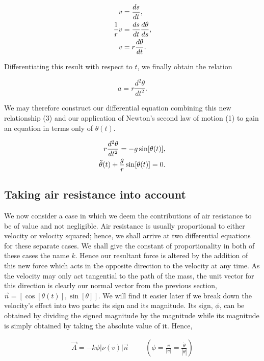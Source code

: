 \documentclass{article}
\begin{document}
\begin{align}
	v &= \frac{ds}{dt}, \notag \\
	\frac{1}{r} v &= \frac{ds}{dt} \frac{d\theta}{ds}, \notag \\
	v &= r \frac{d\theta}{dt}.
\end{align}

Differentiating this result with respect to $t$, we finally obtain the relation

\begin{equation}
	a = r \frac{d^2\theta}{dt^2}.
\end{equation}

We may therefore construct our differential equation combining this new relationship (3) and our application of Newton's second law of motion (1) to gain an equation in terms only of $\theta(t)$.

\begin{align}
	r \frac{d^2\theta}{dt^2} = -g\sin[\theta(t)], \notag \\
	\ddot{\theta}(t) + \frac{g}{r}\sin[\theta(t)] = 0.
\end{align}

\subsection{Taking air resistance into account}

We now consider a case in which we deem the contributions of air resistance to be of value and not negligible. Air resistance is usually proportional to either velocity or velocity squared; hence, we shall arrive at two differential equations for these separate cases. We shall give the constant of proportionality in both of these cases the name $k$. Hence our resultant force is altered by the addition of this new force which acts in the opposite direction to the velocity at any time. As the velocity may only act tangential to the path of the mass, the unit vector for this direction is clearly our normal vector from the previous section, $\vec{n} = [\cos[\theta(t)], \sin[\theta]]$. We will find it easier later if we break down the velocity's effect into two parts: its sign and its magnitude. Its sign, $\phi$, can be obtained by dividing the signed magnitude by the magnitude while its magnitude is simply obtained by taking the absolute value of it. Hence,

\begin{align*}
	\vec{A} = -k\phi|\nu(v)|\vec{n} &&& \left(\phi = \frac{v}{|v|} = \frac{\dot{\theta}}{|\dot{\theta}|}\right)
\end{align*}
\end{document}
